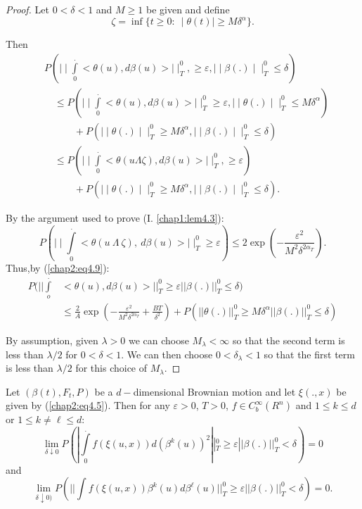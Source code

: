 \begin{proof}
Let $ 0 < \delta < 1 $ and $ M \ge 1 $ be given and define 
$$
\zeta = \inf \{ t \ge 0 : ~ \mid \theta (t) \mid \ge M \delta^\alpha
\}. 
$$

Then
\begin{align*}
& P ( \mid\mid \int \limits^{.}_{0} < \theta (u),  d \beta (u)   > 
\mid\mid^0_T,  \ge \varepsilon,  \mid\mid \beta ( . ) \mid\mid^0_T 
\leq \delta ) \\ 
& \quad \leq P ( \mid\mid \int \limits^{.}_{0} < \theta (u),  d \beta (u)   >
 \mid\mid^0_T  \ge \varepsilon,  \mid\mid \theta ( . )
\mid\mid^0_T  \leq  M \delta^\alpha ) \\ 
 & \qquad \quad +  P ( \mid\mid \theta ( . )  \mid\mid^0_T \ge M
\delta^\alpha,  
 \mid\mid \beta ( . ) \mid\mid^0_T \leq \delta ) \\ 
 & \quad \leq P  ( \mid\mid \int \limits^{.}_{0} < \theta ( u  \Lambda 
 \zeta ),  d \beta (u)   >  \mid\mid^0_T,  \ge \varepsilon) \\ 
& \qquad  \quad +  P ( \mid\mid \theta ( . )  \mid\mid^0_T \ge M
 \delta^\alpha,  
 \mid\mid \beta ( . ) \mid\mid^0_T \leq \delta ). 
\end{align*}

By the argument used to prove (I. \ref{chap1:lem4.3}):
$$
P ( \mid\mid \int \limits^{.}_{0} < \theta ( u ~ \Lambda ~ \zeta ),  ~
d\beta (u)  > \mid\mid^0_T \ge \varepsilon )  \leq 2 \exp ( - \frac{
  \varepsilon^2}{M^2 \delta^{2  \alpha_T}}). 
$$
Thus,\pageoriginale by (\ref{chap2:eq4.9}):
\begin{align*} 
P(|| \int\limits_o^. & < \theta(u), d\beta(u) >  ||^0_T \ge
\varepsilon || \beta(.) ||^0_T \le \delta )\\ 
& \le  \frac{2}{A} \exp ( - \frac{\varepsilon^2}{M^2\delta^{2\alpha_T}}
+ \frac{BT}{\delta^2}) +  P( ||\theta (.) ||^0_T \ge
M\delta^\alpha  ||  \beta(.)  ||^0_T \le \delta) 
\end{align*}

By assumption, given $\lambda > 0$ we can choose $M_\lambda < \infty $
so that the  second term is less than $\lambda/2$ for $0 < \delta <
1$. We can then choose $0 < \delta_\lambda <  1$ so that the first
term is less than $\lambda/2$ for this choice of $M_\lambda$. 
\end{proof}

\setcounter{lemma}{18}
\begin{lemma}\label{chap2:lem4.19}%
Let $(\beta(t),F_t,P)$ be a $d-$dimensional Brownian motion and let
$\xi(.,x)$ be given by (\ref{chap2:eq4.5}). Then for any $\varepsilon
> 0$, $T > 0$, 
$f\in C^\infty_b(R^n)$ and $1 \le k \le d$ or $1 \le k \neq \ell \le d$: 
$$ 
\lim_{\delta \downarrow 0} P( | \int\limits^._0 f(\xi(u,x))
d(\beta^k(u))^2  ||^0_T \ge \varepsilon ||\beta(.) ||^0_T < \delta) 
= 0 
$$
and   
$$ 
\lim_{\delta \downarrow 0)}  P(|| \int f(\xi(u,x))
\beta^k(u)d\beta^\ell(u) ||^0_T \ge \varepsilon  || \beta(.) ||^0_T
< \delta) = 0. 
$$
\end{lemma}

